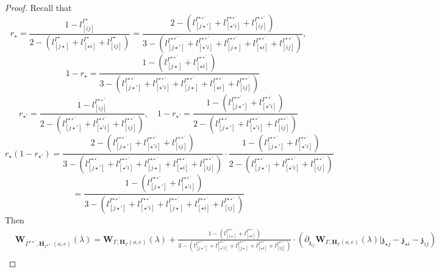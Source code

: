 \documentclass[11pt]{amsart}
\theoremstyle{definition}
\theoremstyle{remark}
\numberwithin{equation}{section}
\begin{document}
\begin{proof}
Recall that
$$
r_{\star}=\frac{1-l^{\Gamma^\star}_{[ ij]}}{2-(l^{\Gamma^\star}_{[ j\star]}+l^{\Gamma^\star}_{[ \star i]}+l^{\Gamma^\star}_{[ ij]})}=\frac{2-(l^{\Gamma^{\star\star'}}_{[ j\star']}+l^{\Gamma^{\star\star'}}_{[ \star 'i]}+l^{\Gamma^{\star\star'}}_{[ ij]})}{3-(l^{\Gamma^{\star\star'}}_{[ j\star']}+l^{\Gamma^{\star\star'}}_{[ \star 'i]}+l^{\Gamma^{\star\star'}}_{[ j\star]}+l^{\Gamma^{\star\star'}}_{[ \star i]}+l^{\Gamma^{\star\star'}}_{[ ij]})},
$$
$$
\quad 1-r_{\star}=\frac{1-(l^{\Gamma^{\star\star'}}_{[ j\star]}+l^{\Gamma^{\star\star'}}_{[ \star i]})}{3-(l^{\Gamma^{\star\star'}}_{[ j\star']}+l^{\Gamma^{\star\star'}}_{[ \star 'i]}+l^{\Gamma^{\star\star'}}_{[ j\star]}+l^{\Gamma^{\star\star'}}_{[ \star i]}+l^{\Gamma^{\star\star'}}_{[ ij]})}
$$
$$
r_{\star'}=\frac{1-l^{\Gamma^{\star\star'}}_{[ ij]}}{2-(l^{\Gamma^{\star\star'}}_{[ j\star']}+l^{\Gamma^{\star\star'}}_{[ \star' i]}+l^{\Gamma^{\star\star'}}_{[ ij]})},\quad 1-r_{\star'}=\frac{1-(l^{\Gamma^{\star\star'}}_{[ j\star']}+l^{\Gamma^{\star\star'}}_{[ \star' i]})}{2-(l^{\Gamma^{\star\star'}}_{[ j\star']}+l^{\Gamma^{\star\star'}}_{[ \star' i]}+l^{\Gamma^{\star\star'}}_{[ ij]})}
$$
$$
r_{\star}(1-r_{\star'})=\frac{2-(l^{\Gamma^{\star\star'}}_{[ j\star']}+l^{\Gamma^{\star\star'}}_{[ \star 'i]}+l^{\Gamma^{\star\star'}}_{[ ij]})}{3-(l^{\Gamma^{\star\star'}}_{[ j\star']}+l^{\Gamma^{\star\star'}}_{[ \star 'i]}+l^{\Gamma^{\star\star'}}_{[ j\star]}+l^{\Gamma^{\star\star'}}_{[ \star i]}+l^{\Gamma^{\star\star'}}_{[ ij]})}\cdot\frac{1-(l^{\Gamma^{\star\star'}}_{[ j\star']}+l^{\Gamma^{\star\star'}}_{[ \star' i]})}{2-(l^{\Gamma^{\star\star'}}_{[ j\star']}+l^{\Gamma^{\star\star'}}_{[ \star' i]}+l^{\Gamma^{\star\star'}}_{[ ij]})}
$$
$$=\frac{1-(l^{\Gamma^{\star\star'}}_{[ j\star']}+l^{\Gamma^{\star\star'}}_{[ \star 'i]})}{3-(l^{\Gamma^{\star\star'}}_{[ j\star']}+l^{\Gamma^{\star\star'}}_{[ \star 'i]}+l^{\Gamma^{\star\star'}}_{[ j\star]}+l^{\Gamma^{\star\star'}}_{[ \star i]}+l^{\Gamma^{\star\star'}}_{[ ij]})}
$$
  Then
  \begin{align*}
& \mathbf{W}_{\Gamma^{\star\star'},\mathbf{H}_{\Gamma^{\star\star'}}(o,e)}(\lambda)  =\mathbf{W}_{\Gamma,\mathbf{H}_{\Gamma}(o,e)}(\lambda)+\frac{1-(l^{\Gamma^{\star\star'}}_{[ j\star]}+l^{\Gamma^{\star\star'}}_{[ \star i]})}{3-(l^{\Gamma^{\star\star'}}_{[ j\star']}+l^{\Gamma^{\star\star'}}_{[ \star 'i]}+l^{\Gamma^{\star\star'}}_{[ j\star]}+l^{\Gamma^{\star\star'}}_{[ \star i]}+l^{\Gamma^{\star\star'}}_{[ ij]})}\cdot\left(\partial_{\mathfrak{z}_{ij}}\mathbf{W}_{\Gamma,\mathbf{H}_{\Gamma}(o,e)}(\lambda)|\mathfrak{z}_{\star j}-\mathfrak{z}_{\star i}-\mathfrak{z}_{ij}\right)\\

\end{align*}
\end{proof}
\end{document}
